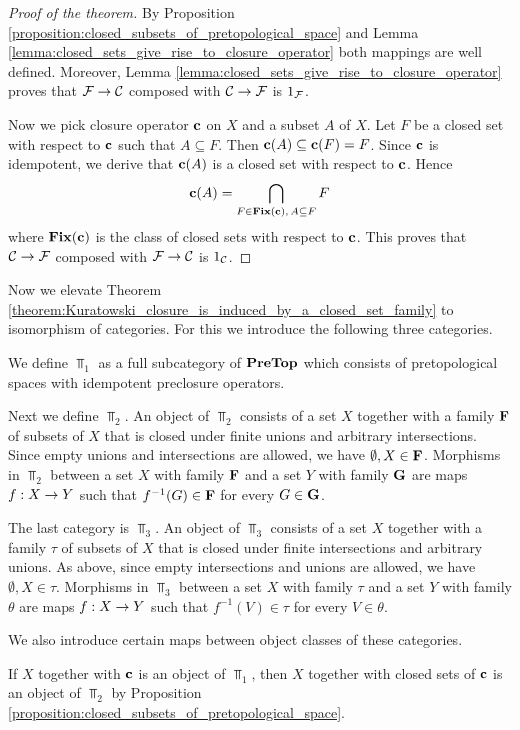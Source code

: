 \begin{proof}[Proof of the theorem]
	By Proposition \ref{proposition:closed_subsets_of_pretopological_space} and Lemma \ref{lemma:closed_sets_give_rise_to_closure_operator} both mappings are well defined. Moreover, Lemma \ref{lemma:closed_sets_give_rise_to_closure_operator} proves that ${\mathcal F} \rightarrow {\mathcal C}$ composed with ${\mathcal C} \rightarrow {\mathcal F}$ is $1_{{\mathcal F}}$.

	Now we pick closure operator $\mathbf{c}$ on $X$ and a subset $A$ of $X$. Let $F$ be a closed set with respect to $\mathbf{c}$ such that $A\subseteq F$. Then $\mathbf{c}(A) \subseteq \mathbf{c}(F) = F$. Since $\mathbf{c}$ is idempotent, we derive that $\mathbf{c}(A)$ is a closed set with respect to $\mathbf{c}$. Hence
	$$\mathbf{c}(A) = \bigcap_{F\in \mathbf{Fix}(\mathbf{c}),\,A\subseteq F}F$$
	where $\mathbf{Fix}(\mathbf{c})$ is the class of closed sets with respect to $\mathbf{c}$. This proves that ${\mathcal C} \rightarrow {\mathcal F}$ composed with ${\mathcal F} \rightarrow {\mathcal C}$ is $1_{{\mathcal C}}$.
\end{proof}
\noindent
Now we elevate Theorem \ref{theorem:Kuratowski_closure_is_induced_by_a_closed_set_family} to isomorphism of categories. For this we introduce the following three categories.

We define $\Top_1$ as a full subcategory of $\mathbf{PreTop}$ which consists of pretopological spaces with idempotent preclosure operators.

Next we define $\Top_2$. An object of $\Top_2$ consists of a set $X$ together with a family $\mathbf{F}$ of subsets of $X$ that is closed under finite unions and arbitrary intersections. Since empty unions and intersections are allowed, we have $\emptyset,X \in \mathbf{F}$. Morphisms in $\Top_2$ between a set $X$ with family $\mathbf{F}$ and a set $Y$ with family $\mathbf{G}$ are maps $f:X\rightarrow Y$ such that $f^{-1}(G) \in \mathbf{F}$ for every $G \in \mathbf{G}$.

The last category is $\Top_3$. An object of $\Top_3$ consists of a set $X$ together with a family $\tau$ of subsets of $X$ that is closed under finite intersections and arbitrary unions. As above, since empty intersections and unions are allowed, we have $\emptyset, X \in \tau$. Morphisms in $\Top_3$ between a set $X$ with family $\tau$ and a set $Y$ with family $\theta$ are maps $f:X\rightarrow Y$ such that $f^{-1}(V) \in \tau$ for every $V \in \theta$.

We also introduce certain maps between object classes of these categories.

If $X$ together with $\mathbf{c}$ is an object of $\Top_1$, then $X$ together with closed sets of $\mathbf{c}$ is an object of $\Top_2$ by Proposition \ref{proposition:closed_subsets_of_pretopological_space}.


